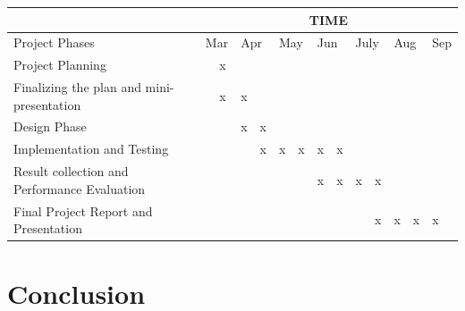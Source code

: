 \documentclass[titlepage]{report}
\begin{document}
\pagebreak
\begin{table}[]
\begin{tabular}{|l|l|l|l|l|l|l|l|l|l|l|l|l|l|}
\hline
                                             & \multicolumn{13}{c|}{TIME}                                                                                                                                             \\ \hline
Project Phases                               & \multicolumn{2}{l|}{Mar} & \multicolumn{2}{l|}{Apr} & \multicolumn{2}{l|}{May} & \multicolumn{2}{l|}{Jun} & \multicolumn{2}{l|}{July} & \multicolumn{2}{l|}{Aug} & Sep \\ \hline
Project Planning                             &            & x           &             &            &             &            &             &            &             &             &             &            &     \\ \hline
Finalizing the plan and mini-presentation    &            & x           & x           &            &             &            &             &            &             &             &             &            &     \\ \hline
Design Phase                                 &            &             & x           & x          &             &            &             &            &             &             &             &            &     \\ \hline
Implementation and Testing                   &            &             &             & x          & x           & x          & x           & x          &             &             &             &            &     \\ \hline
Result collection and Performance Evaluation &            &             &             &            &             &            & x           & x          & x           & x           &             &            &     \\ \hline
Final Project Report and Presentation        &            &             &             &            &             &            &             &            &             & x           & x           & x          & x   \\ \hline
\end{tabular}
\end{table}




\chapter{Conclusion}
\end{document}
